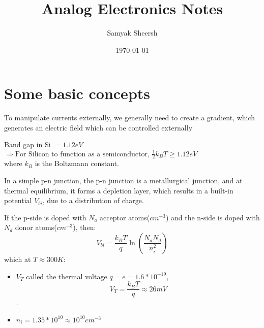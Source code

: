 \documentclass[12pt]{article}
\author{Samyak Sheersh}
\date{\today}
\title{Analog Electronics Notes}
\begin{document}
\maketitle
\tableofcontents

\section{Some basic concepts}
To manipulate currents externally, we generally need to create a gradient, which generates an electric field which can be controlled externally

Band gap in Si $=1.12 eV$\\
$\Rightarrow \text{For Silicon to function as a semiconductor, } \frac{1}{2}k_{B} T\geq 1.12 eV$\\

where $k_B$ is the Boltzmann constant.

In a simple p-n junction, the p-n junction is a metallurgical junction, and at thermal equilibrium, it forms a depletion layer, which results in a built-in potential $V_{bi}$, due to a distribution of charge. 

If the p-side is doped with $N_a$ acceptor atoms($cm^{-3}$) and the n-side is doped with $N_d$ donor atoms($cm^{-3}$), then:
\begin{equation}
    V_{bi}=\frac{k_B T}{q}\ln(\frac{N_a N_d}{n_{i}^{2}})
\end{equation}
which at $T\approx 300 K$:
\begin{itemize}
    \item $V_T$ called the thermal voltage $q=e=1.6*10^{-19}$, $$V_T=\frac{k_B T}{q}\approx 26mV$$. 
    \item $n_i=1.35*10^{10}\approx 10^{10} cm^{-3}$
\end{itemize}
\end{document}
